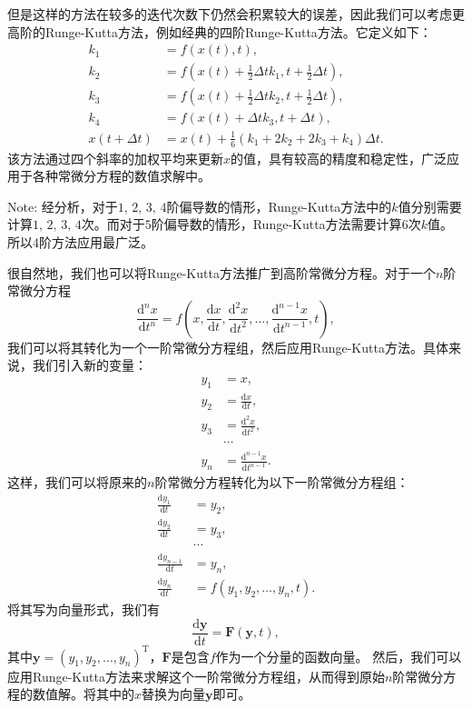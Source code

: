 \documentclass[a4paper, 12pt]{article}
\begin{document}
    但是这样的方法在较多的迭代次数下仍然会积累较大的误差，因此我们可以考虑更高阶的Runge-Kutta方法，例如经典的四阶Runge-Kutta方法。它定义如下：
    \begin{align*}  
        k_1&=f(x(t),t),\\
        k_2&=f\left(x(t)+\frac{1}{2}\Delta tk_1,t+\frac{1}{2}\Delta t\right),\\
        k_3&=f\left(x(t)+\frac{1}{2}\Delta tk_2,t+\frac{1}{2}\Delta t\right),\\
        k_4&=f\left(x(t)+\Delta tk_3,t+\Delta t\right),\\
        x(t+\Delta t)&=x(t)+\frac{1}{6}(k_1+2k_2+2k_3+k_4)\Delta t.
    \end{align*}
    该方法通过四个斜率的加权平均来更新$x$的值，具有较高的精度和稳定性，广泛应用于各种常微分方程的数值求解中。

    Note: 经分析，对于$1,\,2,\,3,\,4$阶偏导数的情形，Runge-Kutta方法中的$k$值分别需要计算$1,\,2,\,3,\,4$次。而对于$5$阶偏导数的情形，Runge-Kutta方法需要计算$6$次$k$值。所以4阶方法应用最广泛。

    很自然地，我们也可以将Runge-Kutta方法推广到高阶常微分方程。对于一个$n$阶常微分方程
    \[
    \frac{\mathrm d^n x}{\mathrm dt^n} = f\left(x, \frac{\mathrm dx}{\mathrm dt}, \frac{\mathrm d^2x}{\mathrm dt^2}, \ldots, \frac{\mathrm d^{n-1}x}{\mathrm dt^{n-1}}, t\right),
    \]
    我们可以将其转化为一个一阶常微分方程组，然后应用Runge-Kutta方法。具体来说，我们引入新的变量：
    \begin{align*}
        y_1 &= x,\\
        y_2 &= \frac{\mathrm dx}{\mathrm dt},\\
        y_3 &= \frac{\mathrm d^2x}{\mathrm dt^2},\\
        &\cdots\\
        y_n &= \frac{\mathrm d^{n-1}x}{\mathrm dt^{n-1}}.
    \end{align*}
    这样，我们可以将原来的$n$阶常微分方程转化为以下一阶常微分方程组：
    \begin{align*}
        \frac{\mathrm dy_1}{\mathrm dt} &= y_2,\\
        \frac{\mathrm dy_2}{\mathrm dt} &= y_3,\\
        &\cdots\\
        \frac{\mathrm dy_{n-1}}{\mathrm dt} &= y_n,\\
        \frac{\mathrm dy_n}{\mathrm dt} &= f(y_1, y_2, \ldots, y_n, t).
    \end{align*}
    将其写为向量形式，我们有
    \[
    \frac{\mathrm d\boldsymbol y}{\mathrm dt} = \boldsymbol F(\boldsymbol y, t),
    \]
    其中$\boldsymbol y = (y_1, y_2, \ldots, y_n)^\mathrm T$，$\boldsymbol F$是包含$f$作为一个分量的函数向量。
    然后，我们可以应用Runge-Kutta方法来求解这个一阶常微分方程组，从而得到原始$n$阶常微分方程的数值解。将其中的$x$替换为向量$\boldsymbol y$即可。
\end{document}
